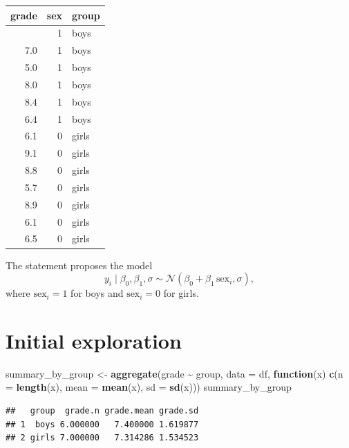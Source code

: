 \documentclass[
  12pt,
]{article}
\newenvironment{Shaded}{\begin{snugshade}}{\end{snugshade}}
\newcommand{\AttributeTok}[1]{\textcolor[rgb]{0.13,0.29,0.53}{#1}}
\newcommand{\ControlFlowTok}[1]{\textcolor[rgb]{0.13,0.29,0.53}{\textbf{#1}}}
\newcommand{\FunctionTok}[1]{\textcolor[rgb]{0.13,0.29,0.53}{\textbf{#1}}}
\newcommand{\NormalTok}[1]{#1}
\newcommand{\OtherTok}[1]{\textcolor[rgb]{0.56,0.35,0.01}{#1}}
\newcommand{\SpecialCharTok}[1]{\textcolor[rgb]{0.81,0.36,0.00}{\textbf{#1}}}
\begin{document}
\begin{longtable}[]{@{}rrl@{}}
\toprule\noalign{}
grade & sex & group \\
\midrule\noalign{}
\endhead
\bottomrule\noalign{}
\endlastfoot
9.6 & 1 & boys \\
7.0 & 1 & boys \\
5.0 & 1 & boys \\
8.0 & 1 & boys \\
8.4 & 1 & boys \\
6.4 & 1 & boys \\
6.1 & 0 & girls \\
9.1 & 0 & girls \\
8.8 & 0 & girls \\
5.7 & 0 & girls \\
8.9 & 0 & girls \\
6.1 & 0 & girls \\
6.5 & 0 & girls \\
\end{longtable}

The statement proposes the model \[
y_i \mid \beta_0, \beta_1, \sigma \sim \mathcal N(\beta_0 + \beta_1\, \text{sex}_i, \sigma),
\] where \(\text{sex}_i = 1\) for boys and \(\text{sex}_i = 0\) for
girls.

\section{Initial exploration}\label{initial-exploration}

\begin{Shaded}
\begin{Highlighting}[]
\NormalTok{summary\_by\_group }\OtherTok{\textless{}{-}} \FunctionTok{aggregate}\NormalTok{(grade }\SpecialCharTok{\textasciitilde{}}\NormalTok{ group, }\AttributeTok{data =}\NormalTok{ df, }\ControlFlowTok{function}\NormalTok{(x) }\FunctionTok{c}\NormalTok{(}\AttributeTok{n =} \FunctionTok{length}\NormalTok{(x), }\AttributeTok{mean =} \FunctionTok{mean}\NormalTok{(x), }\AttributeTok{sd =} \FunctionTok{sd}\NormalTok{(x)))}
\NormalTok{summary\_by\_group}
\end{Highlighting}
\end{Shaded}

\begin{verbatim}
##   group  grade.n grade.mean grade.sd
## 1  boys 6.000000   7.400000 1.619877
## 2 girls 7.000000   7.314286 1.534523
\end{verbatim}
\end{document}
